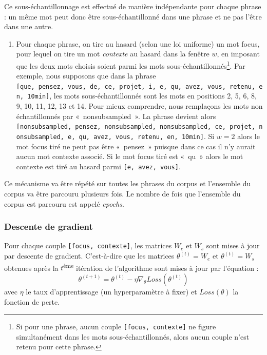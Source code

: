 \documentclass[11pt,french,french]{article}
\providecommand{\tightlist}{%
  \setlength{\parskip}{0pt}
  }
\let\rmarkdownfootnote\footnote%
\def\footnote{\protect\rmarkdownfootnote}
\begin{document}
Ce sous-échantillonnage est effectué de manière indépendante pour chaque
phrase : un même mot peut donc être sous-échantillonné dans une phrase
et ne pas l'être dans une autre.

\begin{enumerate}
\def\labelenumi{\arabic{enumi}.}
\setcounter{enumi}{1}
\tightlist
\item
  Pour chaque phrase, on tire au hasard (selon une loi uniforme) un mot
  focus, pour lequel on tire un mot \emph{contexte} au hasard dans la
  fenêtre \(w\), en imposant que les deux mots choisis soient parmi les
  mots sous-échantillonnés\footnote{Si pour une phrase, aucun couple
    \texttt{{[}focus,\ contexte{]}} ne figure simultanément dans les
    mots sous-échantillonnés, alors aucun couple n'est retenu pour cette
    phrase.}. Par exemple, nous supposons que dans la phrase
  \texttt{{[}que,\ pensez,\ vous,\ de,\ ce,\ projet,\ i,\ e,\ qu,\ avez,\ vous,\ retenu,\ en,\ 10min{]}},
  les mots sous-échantillonnés sont les mots en positions 2, 5, 6, 8, 9,
  10, 11, 12, 13 et 14. Pour mieux comprendre, nous remplaçons les mots
  non échantillonnés par «~nonsubsampled~». La phrase devient alors
  \texttt{{[}nonsubsampled,\ pensez,\ nonsubsampled,\ nonsubsampled,\ ce,\ projet,\ nonsubsampled,\ e,\ qu,\ avez,\ vous,\ retenu,\ en,\ 10min{]}}.
  Si \(w=2\) alors le mot focus tiré ne peut pas être «~pensez~» puisque
  dans ce cas il n'y aurait aucun mot contexte associé. Si le mot focus
  tiré est «~qu~» alors le mot contexte est tiré au hasard parmi
  \texttt{{[}e,\ avez,\ vous{]}}.
\end{enumerate}

Ce mécanisme va être répété sur toutes les phrases du corpus et
l'ensemble du corpus va être parcouru plusieurs fois. Le nombre de fois
que l'ensemble du corpus est parcouru est appelé \emph{epochs}.

\subsubsection{Descente de gradient}\label{subsec:descentedegradient}

Pour chaque couple \texttt{{[}focus,\ contexte{]}}, les matrices \(W_e\)
et \(W_s\) sont mises à jour par descente de gradient. C'est-à-dire que
les matrices \(\theta^{(t)} = W_e\) et \(\theta^{(t)} = W_s\) obtenues
après la \(t\)\textsuperscript{ème} itération de l'algorithme sont mises
à jour par l'équation : \[
\theta^{(t+1)} = \theta^{(t)} - \eta \nabla_\theta Loss(\theta^{(t)})
\] avec \(\eta\) le taux d'apprentissage (un hyperparamètre à fixer) et
\(Loss(\theta)\) la fonction de perte.
\end{document}
